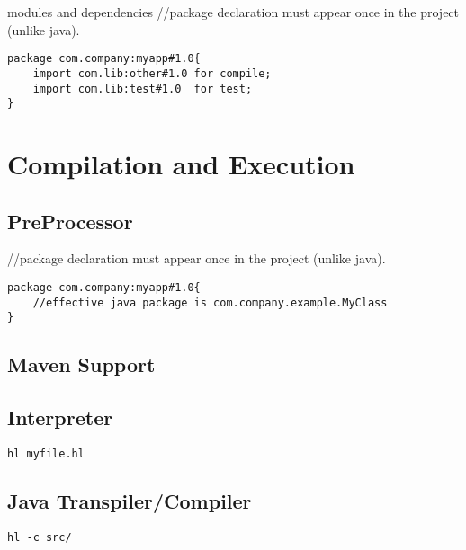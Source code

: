 \documentclass{tufte-book}
\begin{document}
            modules and dependencies
//package declaration must appear once in the project (unlike java).

            \begin{lstlisting}
package com.company:myapp#1.0{
    import com.lib:other#1.0 for compile;
    import com.lib:test#1.0  for test;
}
            \end{lstlisting}


        \chapter{Compilation and Execution}

            \section{PreProcessor}

            //package declaration must appear once in the project (unlike java).
            \begin{lstlisting}
package com.company:myapp#1.0{
    //effective java package is com.company.example.MyClass
}
            \end{lstlisting}

            \section{Maven Support}

            \section{Interpreter}
            \begin{lstlisting}
hl myfile.hl
            \end{lstlisting}

            \section{Java Transpiler/Compiler}

            \begin{lstlisting}
hl -c src/
            \end{lstlisting}
\end{document}
